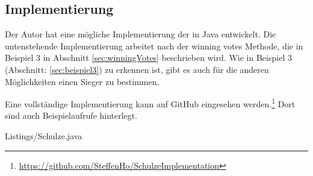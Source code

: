 \subsection{Implementierung}
\label{sec:implementierung}

Der Autor hat eine mögliche Implementierung der \schulze in Java entwickelt. Die untenstehende Implementierung arbeitet nach der \glqq winning votes \grqq{} Methode, die in Beispiel 3 in Abschnitt \ref{sec:winningVotes} beschrieben wird. Wie in Beispiel 3 (Abschnitt: \ref{sec:beispiel3}) zu erkennen ist, gibt es auch für die anderen Möglichkeiten einen Sieger zu bestimmen.

Eine vollständige Implementierung kann auf GitHub eingesehen werden.\footnote{\url{https://github.com/SteffenHo/SchulzeImplementation}} Dort sind auch Beispielaufrufe hinterlegt. 


{Listings/Schulze.java}

